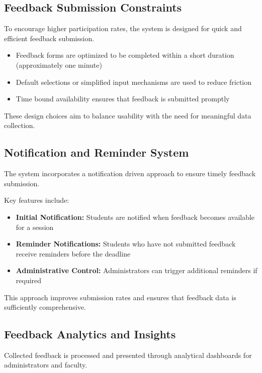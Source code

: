 \subsection{Feedback Submission Constraints}

To encourage higher participation rates, the system is designed for quick and efficient feedback
submission.

\begin{itemize}
    \item Feedback forms are optimized to be completed within a short duration (approximately one
    minute)
    \item Default selections or simplified input mechanisms are used to reduce friction
    \item Time bound availability ensures that feedback is submitted promptly
\end{itemize}

These design choices aim to balance usability with the need for meaningful data collection.

\subsection{Notification and Reminder System}

The system incorporates a notification driven approach to ensure timely feedback submission.

Key features include:

\begin{itemize}
    \item \textbf{Initial Notification:} Students are notified when feedback becomes available for a session
    \item \textbf{Reminder Notifications:} Students who have not submitted feedback receive reminders
    before the deadline
    \item \textbf{Administrative Control:} Administrators can trigger additional reminders if required
\end{itemize}

This approach improves submission rates and ensures that feedback data is sufficiently
comprehensive.

\subsection{Feedback Analytics and Insights}

Collected feedback is processed and presented through analytical dashboards for administrators and
faculty.


